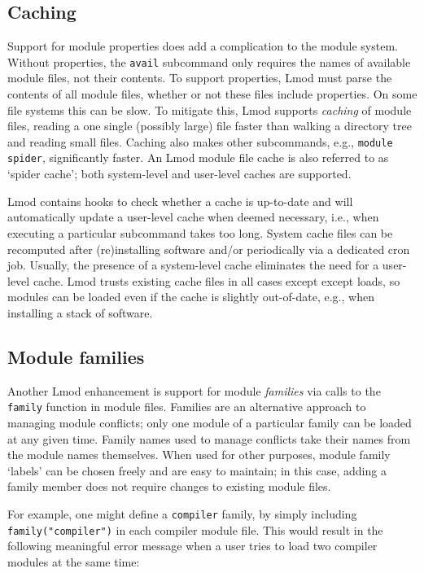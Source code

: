 \subsection{Caching}

Support for module properties does add a complication to the module
system.  Without properties, the \texttt{\small avail} subcommand only requires the
names of available module files, not their contents.  To support properties, Lmod must parse the contents of all 
module files, whether or not these files include properties. On some file systems this can be slow.  To mitigate this, Lmod supports
\emph{caching} of module files, reading a one single (possibly large)
file faster than walking a directory tree and reading small files.
Caching also makes other subcommands, e.g., \texttt{\small module spider},
significantly faster. An Lmod module file cache is also referred to as
`spider cache'; both system-level and user-level caches are supported.

Lmod contains hooks to check whether a cache is up-to-date and will automatically
update a user-level cache when deemed necessary, i.e., when executing a particular
subcommand takes too long. System cache files can be recomputed after (re)installing software and/or periodically via a dedicated cron job. Usually, the presence of a
system-level cache eliminates the need for a user-level cache.
Lmod trusts existing cache files in all cases except except loads, so modules can be loaded even if the cache is slightly out-of-date,
e.g., when installing a stack of software.


\subsection{Module families}

Another Lmod enhancement is support for module
\emph{families} via calls to the \texttt{\small family} function in module files.
Families are an alternative approach to managing module conflicts; only one module of
a particular family can be loaded at any given time. Family names used to manage conflicts take their names from the module names themselves. When used for other purposes, module family `labels' can be chosen freely and are easy
to maintain; in this case, adding a family member does not
require changes to existing module files.

For example, one might define a \texttt{\small compiler} family, by
simply including \texttt{\small family("compiler")} in each compiler module file.
This would result in the following meaningful error message when a user tries to
load two compiler modules at the same time:


